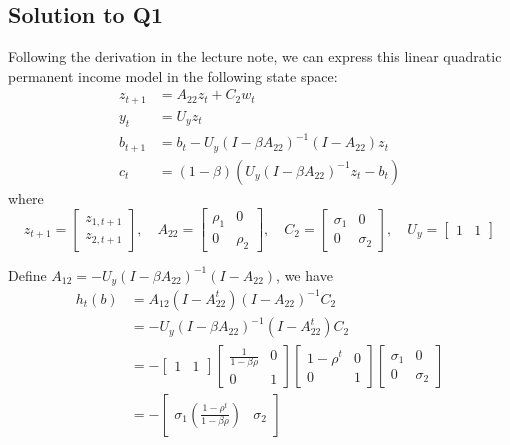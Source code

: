 \documentclass[11pt]{article}
\theoremstyle{definition}
\theoremstyle{boldtitle} %
\numberwithin{equation}{section}
\numberwithin{figure}{section}
\numberwithin{table}{section}
\begin{document}
\subsection*{Solution to Q1}
Following the derivation in the lecture note, we can express this linear quadratic permanent income model in the following state space:
\begin{align*}
    z_{t+1} & = A_{22} z_t + C_2 w_t \\
    y_t & = U_y z_t \\ 
    b_{t+1} &= b_t - U_y \left(I - \beta A_{22} \right)^{-1} \left( I - A_{22}\right) z_t \\
    c_t &= (1 - \beta) \left(U_y (I - \beta A_{22})^{-1} z_t - b_t \right)
\end{align*}
where 
\[
z_{t+1} = \begin{bmatrix}
z_{1,t+1} \\
z_{2,t+1} 
\end{bmatrix}, \quad 
A_{22} = \begin{bmatrix}
\rho_1 & 0 \\
0 & \rho_2
\end{bmatrix}, \quad 
C_2 = \begin{bmatrix}
\sigma_1 & 0 \\
0 & \sigma_2
\end{bmatrix}, \quad 
U_y = \begin{bmatrix}
1 & 1
\end{bmatrix}
\]

Define $A_{12} = - U_y \left(I - \beta A_{22} \right)^{-1} \left( I - A_{22}\right)$, 
we have 
\begin{align*}
    h_t(b) & = A_{12} \left( I - A_{22}^{t} \right) \left( I - A_{22} \right)^{-1} C_2 \\ 
        & =  - U_y \left(I - \beta A_{22} \right)^{-1} \left( I - A_{22}^{t} \right) C_2 \\
        & = - \begin{bmatrix} 1 & 1 \end{bmatrix} \begin{bmatrix} \frac{1}{1 - \beta \rho} & 0 \\ 0 & 1 \end{bmatrix} \begin{bmatrix} 1 - \rho^t & 0 \\ 0 & 1 \end{bmatrix} \begin{bmatrix} \sigma_1 & 0 \\ 0 & \sigma_2 \end{bmatrix} \\ 
        & = - \begin{bmatrix} \sigma_1 \left( \frac{1 - \rho^t}{1 - \beta \rho} \right) & \sigma_2 \end{bmatrix}
\end{align*}
\end{document}
